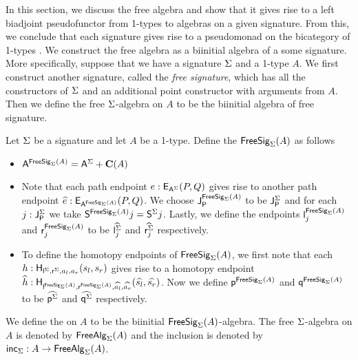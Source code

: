 In this section, we discuss the free algebra and show that it gives rise to a left biadjoint pseudofunctor from 1-types to algebras on a given signature.
From this, we conclude that each signature gives rise to a pseudomonad on the bicategory of 1-types \cite{lack2000coherent}.
We construct the free algebra as a biinitial algebra of a some signature.
More specifically, suppose that we have a signature $\sign$ and a 1-type $A$.
We first construct another signature, called the \emph{free signature}, which has all the constructors of $\sign$ and an additional point constructor with arguments from $A$.
Then we define the free $\sign$-algebra on $A$ to be the biinitial algebra of free signature.

\begin{definition}
Let $\sign$ be a signature and let $A$ be a 1-type.
Define the  $\freesign{\sign}{A}$ as follows
\begin{itemize}
	\item $\pointconstr[\freesign{\sign}{A}] = \sumP{\pointconstr[\sign]}{\constantP{A}}$
	\item Note that each path endpoint $e : \pathendpoint{\pointconstr[\sign]}{P}{Q}$ gives rise to another path endpoint $\freepath{e} : \pathendpoint{\pointconstr[\freesign{\sign}{A}]}{P}{Q}$.
	We choose $\pathlabel[\freesign{\sign}{A}]$ to be $\pathlabel[\sign]$ and for each $j : \pathlabel[\sign]$ we take $\patharg[\freesign{\sign}{A}]{j} = \patharg[\sign]{j}$.
	Lastly, we define the endpoints $\pathleft[\freesign{\sign}{A}]_j$ and $\pathright[\freesign{\sign}{A}]_j$ to be $\freepath{\pathleft[\sign]_j}$ and $\freepath{\pathright[\sign]_j}$ respectively.
	\item To define the homotopy endpoints of $\freesign{\sign}{A}$, we first note that each $h : \homotendpoint{\pathleft[\sign]}{\pathright[\sign]}{a_l}{a_r}{s_l}{s_r}$ gives rise to a homotopy endpoint $\freehomot{h} : \homotendpoint{\pathleft[\freesign{\sign}{A}]}{\pathright[\freesign{\sign}{A}]}{\freepath{a_l}}{\freepath{a_r}}{\freepath{s_l}}{\freepath{s_r}}$.
	Now we define $\homotleft[\freesign{\sign}{A}]$ and $\homotright[\freesign{\sign}{A}]$ to be $\freehomot{\homotleft[\sign]}$ and $\freehomot{\homotright[\sign]}$ respectively.
\end{itemize}
We define the  on $A$ to be the biinitial $\freesign{\sign}{A}$-algebra.
The free $\sign$-algebra on $A$ is denoted by $\freealg{\sign}{A}$ and the inclusion is denoted by $\freealginc{\sign} : A \rightarrow \freealg{\sign}{A}$.
\end{definition}

